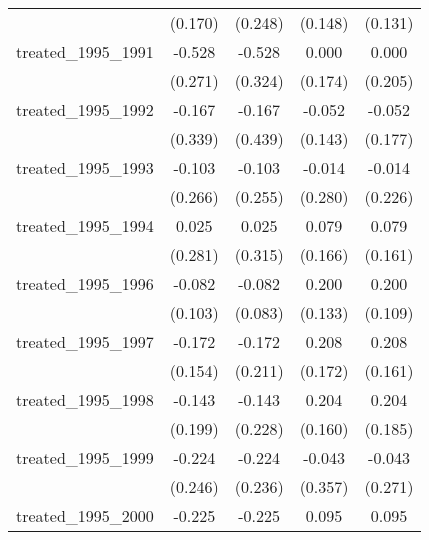 {\begin{tabular}{l*{4}{c}}
            &     (0.170)         &     (0.248)         &     (0.148)         &     (0.131)         \\
[1em]
treated\_1995\_1991&      -0.528         &      -0.528         &       0.000         &       0.000         \\
            &     (0.271)         &     (0.324)         &     (0.174)         &     (0.205)         \\
[1em]
treated\_1995\_1992&      -0.167         &      -0.167         &      -0.052         &      -0.052         \\
            &     (0.339)         &     (0.439)         &     (0.143)         &     (0.177)         \\
[1em]
treated\_1995\_1993&      -0.103         &      -0.103         &      -0.014         &      -0.014         \\
            &     (0.266)         &     (0.255)         &     (0.280)         &     (0.226)         \\
[1em]
treated\_1995\_1994&       0.025         &       0.025         &       0.079         &       0.079         \\
            &     (0.281)         &     (0.315)         &     (0.166)         &     (0.161)         \\
[1em]
treated\_1995\_1996&      -0.082         &      -0.082         &       0.200         &       0.200         \\
            &     (0.103)         &     (0.083)         &     (0.133)         &     (0.109)         \\
[1em]
treated\_1995\_1997&      -0.172         &      -0.172         &       0.208         &       0.208         \\
            &     (0.154)         &     (0.211)         &     (0.172)         &     (0.161)         \\
[1em]
treated\_1995\_1998&      -0.143         &      -0.143         &       0.204         &       0.204         \\
            &     (0.199)         &     (0.228)         &     (0.160)         &     (0.185)         \\
[1em]
treated\_1995\_1999&      -0.224         &      -0.224         &      -0.043         &      -0.043         \\
            &     (0.246)         &     (0.236)         &     (0.357)         &     (0.271)         \\
[1em]
treated\_1995\_2000&      -0.225         &      -0.225         &       0.095         &       0.095         \\

\end{tabular}}
